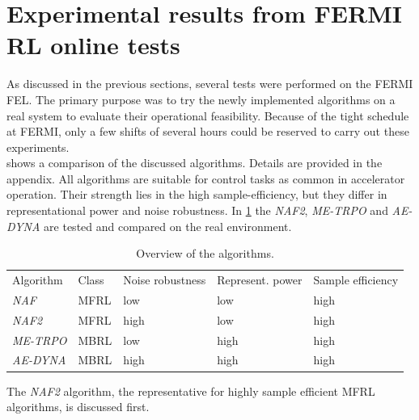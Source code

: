 \documentclass[
reprint,
amsmath,amssymb,amsfonts,clevref,
aps,
prstab,
]{revtex4-2}
\begin{document}
	\section{Experimental results from FERMI RL online tests}\label{sec:Experimental results from FERMI RL online tests}
	As discussed in the previous sections, several tests were performed on the FERMI FEL.
	The primary purpose was to try the newly implemented algorithms on a real system to evaluate their operational feasibility. 
	Because of the tight schedule at FERMI, only a few shifts of several hours could be reserved to carry out these experiments.\\ 
	 shows a comparison of the discussed algorithms. Details are provided in the appendix. All algorithms are suitable for control tasks as common in accelerator operation. Their strength lies in the high sample-efficiency, but they differ in representational power and noise robustness. In \cref{sec:Experimental results from FERMI RL online tests} the \emph{NAF2},
	\emph{ME-TRPO} and \emph{AE-DYNA} are tested and compared on the real environment.
	\begin{table}[h!]%
		\caption{\label{tab:overview_algorithms}%
			Overview of the algorithms.
		}
		\begin{ruledtabular}
			\begin{tabular}{l p{1.5cm}p{1.5cm}p{1.5cm}p{1.5cm}}
				\textrm{Algorithm}&
				\textrm{Class}&
				\textrm{Noise \newline robustness}&
				\textrm{Represent. power}&
				\textrm{Sample \newline efficiency}\\
				\colrule
				\emph{NAF} & MFRL & low &low &high\\
				\emph{NAF2} &MFRL & high &low& high\\
				\emph{ME-TRPO} & MBRL & low& high& high\\
				\emph{AE-DYNA} & MBRL & high& high& high\\
			\end{tabular}
		\end{ruledtabular}
	\end{table}
	The \emph{NAF2} algorithm, the representative for highly sample efficient MFRL algorithms, is discussed first.
\end{document}
